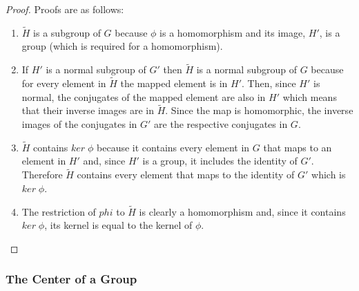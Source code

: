 \documentclass[MathsNotesBase.tex]{subfiles}
\begin{document}
{		\bigskip
		\begin{proof}
			Proofs are as follows:
			\begin{enumerate}[label=(\roman*)]
				\item{$\tilde{H}$ is a subgroup of $G$ because $\phi$ is a homomorphism and its image, $H'$, is a group (which is required for a homomorphism).}
				\item{If $H'$ is a normal subgroup of $G'$ then $\tilde{H}$ is a normal subgroup of $G$ because for every element in $\tilde{H}$ the mapped element is in $H'$. Then, since $H'$ is normal, the conjugates of the mapped element are also in $H'$ which means that their inverse images are in $\tilde{H}$. Since the map is homomorphic, the inverse images of the conjugates in $G'$ are the respective conjugates in $G$.}
				\item{$\tilde{H}$ contains $ker\;\phi$ because it contains every element in $G$ that maps to an element in $H'$ and, since $H'$ is a group, it includes the identity of $G'$. Therefore $\tilde{H}$ contains every element that maps to the identity of $G'$ which is $ker\;\phi$.}
				\item{The restriction of $phi$ to $\tilde{H}$ is clearly a homomorphism and, since it contains $ker\;\phi$, its kernel is equal to the kernel of $\phi$.}
			\end{enumerate}
		\end{proof}
		
		
		\bigskip\bigskip
		\subsubsection{The Center of a Group}
		
}
\end{document}
